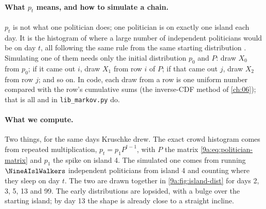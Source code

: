 \paragraph{What $p_t$ means, and how to simulate a chain.}
$p_t$ is not what one politician does; one politician is on exactly one island each day. It is
the histogram of where a large number of independent politicians would be on day $t$, all
following the same rule from the same starting distribution . Simulating one
of them needs only the initial distribution $p_0$ and $P$: draw $X_0$ from $p_0$; if it came
out $i$, draw $X_1$ from row $i$ of $P$; if that came out $j$, draw $X_2$ from row $j$; and so
on. In code, each draw from a row is one uniform number compared with the row's cumulative
sums (the inverse-CDF method of \cref{ch:06}); that is all  and
 in \texttt{lib\_markov.py} do.

\paragraph{What we compute.}
Two things, for the same days Kruschke drew. The exact crowd histogram comes from repeated
multiplication, $p_t=p_1P^{t-1}$, with $P$ the matrix \eqref{9a:eq:politician-matrix} and $p_1$
the spike on island 4. The simulated one comes from running $\NineAIslWalkers$ independent
politicians from island 4 and counting where they sleep on day $t$. The two are drawn together
in \cref{9a:fig:island-dist} for days 2, 3, 5, 13 and 99. The early distributions are
lopsided, with a bulge over the starting island; by day 13 the shape is already close to a
straight incline.

